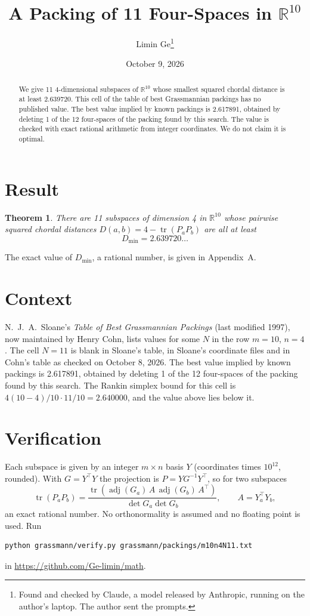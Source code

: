 \documentclass[11pt,a4paper]{article}
\title{A Packing of 11 Four-Spaces in $\mathbb{R}^{10}$}
\author{Limin Ge\thanks{Found and checked by Claude, a model released by Anthropic, running on the author's laptop. The author sent the prompts.}}
\date{October 9, 2026}
\newtheorem*{theorem}{Theorem}
\begin{document}
\maketitle
\begin{abstract}
We give 11 4-dimensional subspaces of $\mathbb{R}^{10}$ whose smallest squared chordal distance is at least 2.639720. This cell of the table of best Grassmannian packings has no published value. The best value implied by known packings is 2.617891, obtained by deleting 1 of the 12 four-spaces of the packing found by this search. The value is checked with exact rational arithmetic from integer coordinates. We do not claim it is optimal.
\end{abstract}

\section{Result}
\begin{theorem}
There are 11 subspaces of dimension 4 in $\mathbb{R}^{10}$ whose pairwise squared chordal distances $D(a,b) = 4 - \operatorname{tr}(P_aP_b)$ are all at least
\[ D_{\min} = 2.639720\ldots \]
\end{theorem}
The exact value of $D_{\min}$, a rational number, is given in Appendix~A.


\section{Context}
N.~J.~A.~Sloane's \emph{Table of Best Grassmannian Packings} (last modified 1997), now maintained by Henry Cohn, lists values for some $N$ in the row $m=10$, $n=4$. The cell $N=11$ is blank in Sloane's table, in Sloane's coordinate files and in Cohn's table as checked on October 8, 2026. The best value implied by known packings is 2.617891, obtained by deleting 1 of the 12 four-spaces of the packing found by this search. The Rankin simplex bound for this cell is $4(10-4)/10\cdot 11/10 = 2.640000$, and the value above lies below it.


\section{Verification}
Each subspace is given by an integer $m\times n$ basis $Y$ (coordinates times $10^{12}$, rounded). With $G=Y^\top Y$ the projection is $P=YG^{-1}Y^\top$, so for two subspaces
\[ \operatorname{tr}(P_aP_b)=\frac{\operatorname{tr}(\operatorname{adj}(G_a)\,A\,\operatorname{adj}(G_b)\,A^\top)}{\det G_a\det G_b},\qquad A=Y_a^\top Y_b, \]
an exact rational number. No orthonormality is assumed and no floating point is used. Run
\begin{verbatim}
python grassmann/verify.py grassmann/packings/m10n4N11.txt
\end{verbatim}
in \url{https://github.com/Ge-limin/math}.
\end{document}

